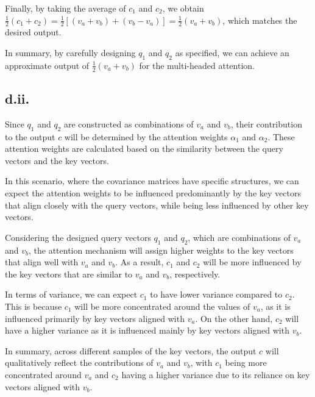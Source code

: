 \documentclass[a4paper]{article}
\begin{document}
Finally, by taking the average of $c_1$ and $c_2$, we obtain $\frac{1}{2} (c_1 + c_2) = \frac{1}{2} [(v_a + v_b) + (v_b - v_a)] = \frac{1}{2} (v_a + v_b)$, which matches the desired output.

In summary, by carefully designing $q_1$ and $q_2$ as specified, we can achieve an approximate output of $\frac{1}{2} (v_a + v_b)$ for the multi-headed attention.

\subsection*{d.ii.}

Since $q_1$ and $q_2$ are constructed as combinations of $v_a$ and $v_b$, their contribution to the output $c$ will be determined by the attention weights $\alpha_1$ and $\alpha_2$. These attention weights are calculated based on the similarity between the query vectors and the key vectors.

In this scenario, where the covariance matrices have specific structures, we can expect the attention weights to be influenced predominantly by the key vectors that align closely with the query vectors, while being less influenced by other key vectors.

Considering the designed query vectors $q_1$ and $q_2$, which are combinations of $v_a$ and $v_b$, the attention mechanism will assign higher weights to the key vectors that align well with $v_a$ and $v_b$. As a result, $c_1$ and $c_2$ will be more influenced by the key vectors that are similar to $v_a$ and $v_b$, respectively.

In terms of variance, we can expect $c_1$ to have lower variance compared to $c_2$. This is because $c_1$ will be more concentrated around the values of $v_a$, as it is influenced primarily by key vectors aligned with $v_a$. On the other hand, $c_2$ will have a higher variance as it is influenced mainly by key vectors aligned with $v_b$.

In summary, across different samples of the key vectors, the output $c$ will qualitatively reflect the contributions of $v_a$ and $v_b$, with $c_1$ being more concentrated around $v_a$ and $c_2$ having a higher variance due to its reliance on key vectors aligned with $v_b$.
\end{document}
